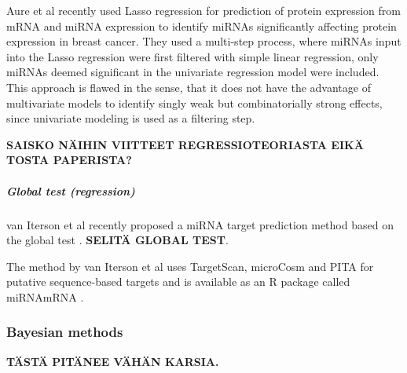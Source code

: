 Aure et al recently used Lasso regression for prediction of protein
expression from mRNA and miRNA expression to identify miRNAs significantly
affecting protein expression in breast cancer. They used a multi-step
process, where miRNAs input into the Lasso regression were first
filtered with simple linear regression, only miRNAs deemed significant
in the univariate regression model were included. This approach is
flawed in the sense, that it does not have the advantage of multivariate
models to identify singly weak but combinatorially strong effects, since univariate
modeling is used as a filtering step.

\textbf{SAISKO NÄIHIN VIITTEET REGRESSIOTEORIASTA EIKÄ TOSTA PAPERISTA?}


\subparagraph{Global test (regression)}\label{global-test-regression}

van Iterson et al recently proposed a miRNA target prediction method based on
the global test \citep{vanIterson2013}. \textbf{SELITÄ GLOBAL TEST}.

The method by van Iterson et al uses TargetScan, microCosm and PITA for
putative sequence-based targets and is available as an R package called
miRNAmRNA \citep{vanItersonWeb}.








\subsubsection{Bayesian methods}\label{bayesian-methods}

\textbf{TÄSTÄ PITÄNEE VÄHÄN KARSIA.}

